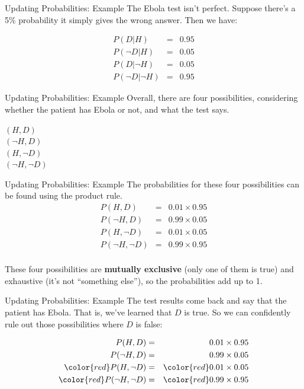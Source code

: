 \documentclass{beamer}
\begin{document}
\begin{frame}[t]{Updating Probabilities: Example}
The Ebola test isn't perfect. Suppose there's a 5\% probability it simply gives
the wrong answer. Then we have:

\begin{eqnarray*}
P(D | H)   &=& 0.95\\
P(\neg D | H) &=& 0.05\\
P(D | \neg H)   &=& 0.05\\
P(\neg D | \neg H) &=& 0.95
\end{eqnarray*}

\end{frame}

\begin{frame}[t]{Updating Probabilities: Example}
Overall, there are four possibilities, considering whether the patient has
Ebola or not, and what the test says.

\begin{center}
$(H, D)$\\
$(\neg H, D)$\\
$(H, \neg D)$\\
$(\neg H, \neg D)$
\end{center}


\end{frame}

\begin{frame}[t]{Updating Probabilities: Example}
The probabilities for these four possibilities can be found using the product
rule.
\begin{eqnarray*}
P(H, D) &=& 0.01 \times 0.95\\
P(\neg H, D) &=& 0.99 \times 0.05\\
P(H, \neg D) &=& 0.01 \times 0.05\\
P(\neg H, \neg D) &=& 0.99 \times 0.95\\
\end{eqnarray*}
\vspace{-45pt}

These four possibilities are {\bf mutually exclusive} (only one of them is true)
and exhaustive (it's not ``something else''), so the probabilities add up to 1.

\end{frame}

\begin{frame}[t]{Updating Probabilities: Example}
The test results come back and say that the patient has Ebola. That is, we've
learned that $D$ is true. So we can confidently rule out those possibilities
where $D$ is false:

\begin{eqnarray*}
P(H, D) &=& 0.01 \times 0.95\\
P(\neg H, D) &=& 0.99 \times 0.05\\
{\color{red} P(H, \neg D)} &=& {\color{red} 0.01 \times 0.05}\\
{\color{red} P(\neg H, \neg D)} &=& {\color{red} 0.99 \times 0.95}\\
\end{eqnarray*}


\end{frame}
\end{document}
